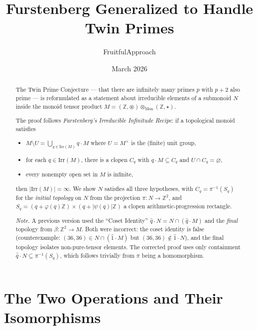 \documentclass[12pt,a4paper]{amsart}
\title[Furstenberg Generalized to Handle Twin Primes]
      {Furstenberg Generalized to Handle Twin Primes}
\author{FruitfulApproach}
\date{March 2026}
\theoremstyle{plain}
\theoremstyle{definition}
\theoremstyle{remark}
\newcommand{\circstar}{\mathbin{\circledast}}
\newcommand{\bstar}{\mathbin{\star}}
\newcommand{\otimesmon}{\otimes_{\mathrm{Mon}}}
\newcommand{\Irr}{\mathrm{Irr}}
\newcommand{\qhat}[1]{\widehat{#1}}
\newcommand{\bbZ}{\mathbb{Z}}
\begin{document}
\maketitle

\begin{abstract}
The Twin Prime Conjecture --- that there are infinitely many primes $p$
with $p+2$ also prime --- is reformulated as a statement about irreducible
elements of a submonoid $N$ inside the monoid tensor product
$M = (\bbZ, \circstar) \otimesmon (\bbZ, \bstar)$.

The proof follows \emph{Furstenberg's Irreducible Infinitude Recipe}: if a
topological monoid satisfies
\begin{itemize}[nosep]
  \item[(R1)] $M \setminus U = \bigcup_{q \in \Irr(M)} q \cdot M$ where $U = M^{\times}$ is the (finite) unit group,
  \item[(R2)] for each $q \in \Irr(M)$, there is a clopen $C_q$ with $q\cdot M \subseteq C_q$ and $U \cap C_q = \varnothing$,
  \item[(R3)] every nonempty open set in $M$ is infinite,
\end{itemize}
then $|\Irr(M)| = \infty$. We show $N$ satisfies all three hypotheses, with
$C_q = \pi^{-1}(S_q)$ for the \emph{initial topology} on $N$ from the
projection $\pi\colon N \to \bbZ^2$, and
$S_q = (q + \varphi(q)\bbZ) \times (q + |\psi(q)|\bbZ)$ a clopen
arithmetic-progression rectangle.

\smallskip
\noindent\textit{Note.} A previous version used the ``Coset Identity''
$\qhat{q} \cdot N = N \cap (\qhat{q} \cdot M)$ and the \emph{final}
topology from $\beta\colon \bbZ^2 \to M$. Both were incorrect: the
coset identity is false (counterexample: $(36,36) \in N \cap
(\qhat{1} \cdot M)$ but $(36,36) \notin \qhat{1} \cdot N$), and the
final topology isolates non-pure-tensor elements. The corrected proof
uses only containment $\qhat{q} \cdot N \subseteq \pi^{-1}(S_q)$,
which follows trivially from $\pi$ being a homomorphism.
\end{abstract}

\section{The Two Operations and Their Isomorphisms}
\end{document}
